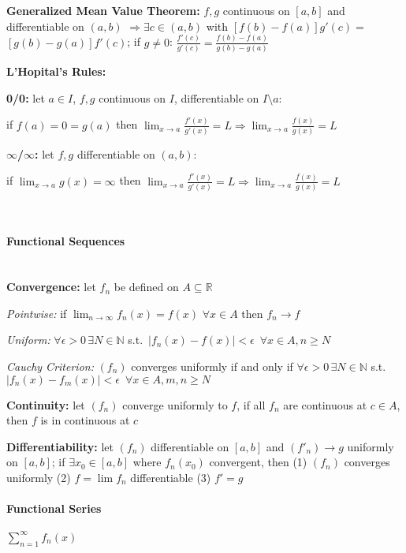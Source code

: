 \documentclass[8pt,twoside]{extarticle}
\begin{document}
\begin{multicols}{2}
\textbf{Generalized Mean Value Theorem:} $f,g$ continuous on $[a,b]$ and differentiable on 
$(a,b)$ $\Rightarrow \exists c\in(a,b)$ with $\left[f(b)-f(a)\right]g'(c) = $  $ \left[g(b)-g(a)\right]f'(c)$; 
if $g\neq0$: $\frac{f'(c)}{g'(c)}=\frac{f(b)-f(a)}{g(b)-g(a)}$

\textbf{L'Hopital's Rules:} 

\textbf{0/0: } let $a\in I$, $f,g$ continuous on $I$, differentiable on $I\setminus a$:  

if $f(a){=}0{=}g(a)$ then $\lim_{x\to a}\frac{f'(x)}{g'(x)} = L \Rightarrow \lim_{x\to a}\frac{f(x)}{g(x)} = L$

\textbf{$\boldsymbol{\infty}$/$\boldsymbol{\infty}$: } let $f,g$ differentiable on $(a,b)$:

if $\lim_{x\to a}g(x)=\infty$ then $\lim_{x\to a}\frac{f'(x)}{g'(x)}=L \Rightarrow \lim_{x\to a}\frac{f(x)}{g(x)}=L$

\ \\


\paragraph{Functional Sequences} \ \\

\textbf{Convergence:} let $f_n$ be defined on $A\subseteq\mathbb{R}$ 

\textit{Pointwise:} if  $\lim_{n\to \infty} f_n(x)=f(x)$ $\forall x \in A$ then $f_n\to f$

\textit{Uniform:} $\forall \epsilon>0 \,\exists N\in\mathbb{N}$ s.t.\ $|f_n(x)-f(x)|<\epsilon \,\,\, \forall x\in A, n\geq N$

\textit{Cauchy Criterion:} $(f_n)$ converges uniformly if and only if  $\forall \epsilon > 0\,\exists N\in \mathbb{N}$ s.t.\ $|f_n(x)-f_m(x)|<\epsilon  \,\,\, \forall x\in A, m,n \geq N$

\textbf{Continuity:}  let $(f_n)$ converge uniformly to $f$, if all $f_n$ are continuous at $c\in A$, then $f$ is in continuous at $c$

\textbf{Differentiability:} let $(f_n)$ differentiable on $[a,b]$ and $(f'_n) \to g$ uniformly on $[a,b]$; if $\exists x_0\in[a,b]$ where $f_n(x_0)$ convergent, then (1) $(f_n)$ converges uniformly (2) $f{=}\lim f_n$ differentiable (3) $f'{=}g$

\paragraph{Functional Series} $\sum_{n=1}^\infty f_n(x)$


\end{multicols}
\end{document}
